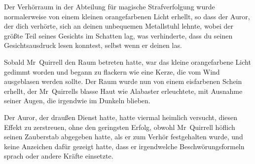 \later

Der Verhörraum in der Abteilung für magische Strafverfolgung wurde normalerweise von einem kleinen orangefarbenen Licht erhellt, so dass der Auror, der dich verhörte, sich an deinen unbequemen Metallstuhl lehnte, wobei der größte Teil seines Gesichts im Schatten lag, was verhinderte, dass du seinen Gesichtsausdruck lesen konntest, selbst wenn er deinen las.

Sobald Mr~Quirrell den Raum betreten hatte, war das kleine orangefarbene Licht gedimmt worden und begann zu flackern wie eine Kerze, die vom Wind ausgeblasen werden sollte. Der Raum wurde nun von einem eisfarbenen Schein erhellt, der Mr~Quirrells blasse Haut wie Alabaster erleuchtete, mit Ausnahme seiner Augen, die irgendwie im Dunkeln blieben.

Der Auror, der draußen Dienst hatte, hatte viermal heimlich versucht, diesen Effekt zu zerstreuen, ohne den geringsten Erfolg, obwohl Mr~Quirrell höflich seinen Zauberstab abgegeben hatte, als er zum Verhör festgehalten wurde, und keine Anzeichen dafür gezeigt hatte, dass er irgendwelche Beschwörungsformeln sprach oder andere Kräfte einsetzte.

